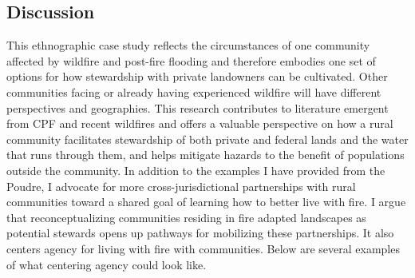 \documentclass[
]{article}
\begin{document}
\subsection{Discussion}\label{discussion-1}

This ethnographic case study reflects the circumstances of one community affected by wildfire and post-fire flooding and therefore embodies one set of options for how stewardship with private landowners can be cultivated. Other communities facing or already having experienced wildfire will have different perspectives and geographies. This research contributes to literature emergent from CPF and recent wildfires and offers a valuable perspective on how a rural community facilitates stewardship of both private and federal lands and the water that runs through them, and helps mitigate hazards to the benefit of populations outside the community. In addition to the examples I have provided from the Poudre, I advocate for more cross-jurisdictional partnerships with rural communities toward a shared goal of learning how to better live with fire. I argue that reconceptualizing communities residing in fire adapted landscapes as potential stewards opens up pathways for mobilizing these partnerships. It also centers agency for living with fire with communities. Below are several examples of what centering agency could look like.
\end{document}
